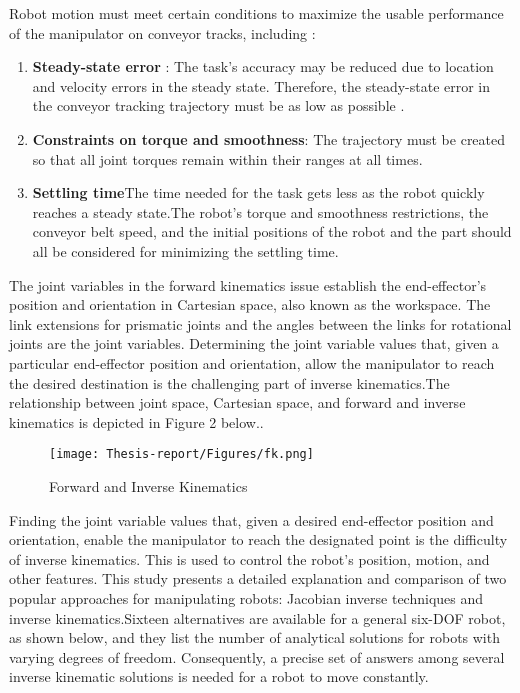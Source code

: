\documentclass[12pt]{article}
\begin{document}
Robot motion must meet certain conditions to maximize the usable performance of the manipulator on conveyor tracks, including \cite{ref14}:
\begin{enumerate}
    \item \textbf{Steady-state error} : The task's accuracy may be reduced due to location and velocity errors in the steady state. Therefore, the steady-state error in the conveyor tracking trajectory must be as low as possible \cite{ref14}.
    \item \textbf{Constraints on torque and smoothness}: The trajectory must be created so that all joint torques remain within their ranges at all times\cite{ref14}.
    \item \textbf{Settling time}The time needed for the task gets less as the robot quickly reaches a steady state.The robot's torque and smoothness restrictions, the conveyor belt speed, and the initial positions of the robot and the part should all be considered for minimizing the settling time\cite{ref14}.
\end{enumerate}
The joint variables in the forward kinematics issue establish the end-effector's position and orientation in Cartesian space, also known as the workspace. The link extensions for prismatic joints and the angles between the links for rotational joints are the joint variables. Determining the joint variable values that, given a particular end-effector position and orientation, allow the manipulator to reach the desired destination is the challenging part of inverse kinematics.The relationship between joint space, Cartesian space, and forward and inverse kinematics is depicted in Figure 2 below.\cite{ref10}.\\

\begin{figure}[h]
    \centering
    \texttt{[image: Thesis-report/Figures/fk.png]}  
    \caption{Forward and Inverse Kinematics \cite{ref10}}
    \label{fig:inverse-kinematics}
\end{figure}

Finding the joint variable values that, given a desired end-effector position and orientation, enable the manipulator to reach the designated point is the difficulty of inverse kinematics. This is used to control the robot's position, motion, and other features. This study presents a detailed explanation and comparison of two popular approaches for manipulating robots: Jacobian inverse techniques and inverse kinematics.Sixteen alternatives are available for a general six-DOF robot, as shown below, and they list the number of analytical solutions for robots with varying degrees of freedom. Consequently, a precise set of answers among several inverse kinematic solutions is needed for a robot to move constantly\cite{ref10}.\\
\end{document}
